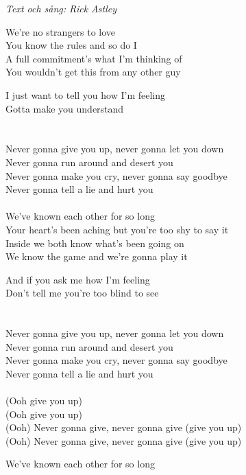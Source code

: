 {\footnotesize\textit{Text och sång: Rick Astley}}\par
\vspace{10pt}
We're no strangers to love\\
You know the rules and so do I\\
A full commitment's what I'm thinking of\\
You wouldn't get this from any other guy\par
\vspace{10pt}
I just want to tell you how I'm feeling\\
Gotta make you understand\\
\\
[Chorus:]\\
Never gonna give you up, never gonna let you down\\
Never gonna run around and desert you\\
Never gonna make you cry, never gonna say goodbye\\
Never gonna tell a lie and hurt you\\
\\
We've known each other for so long\\
Your heart's been aching but you're too shy to say it\\
Inside we both know what's been going on\\
We know the game and we're gonna play it\par
\vspace{10pt}
And if you ask me how I'm feeling \\
Don't tell me you're too blind to see\\
\\
[Chorus x2]\\
Never gonna give you up, never gonna let you down\\
Never gonna run around and desert you\\
Never gonna make you cry, never gonna say goodbye\\
Never gonna tell a lie and hurt you\\
\\
(Ooh give you up)\\
(Ooh give you up)\\
(Ooh) Never gonna give, never gonna give (give you up)\\
(Ooh) Never gonna give, never gonna give (give you up)\par
\vspace{10pt}
We've known each other for so long\\
